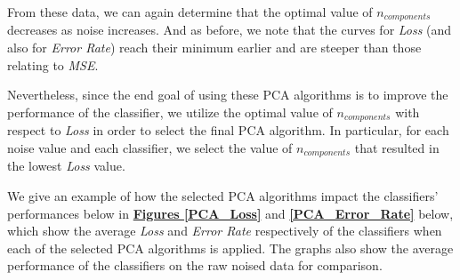 \documentclass[12pt]{article}
\begin{document}
From these data, we can again determine that the optimal value of $n_{components}$ decreases as noise increases. And as before, we note that the curves for \textit{Loss} (and also for \textit{Error Rate}) reach their minimum earlier and are steeper than those relating to \textit{MSE}.

Nevertheless, since the end goal of using these PCA algorithms is to improve the performance of the classifier, we utilize the optimal value of $n_{components}$ with respect to \textit{Loss} in order to select the final PCA algorithm. In particular, for each noise value and each classifier, we select the value of $n_{components}$ that resulted in the lowest \textit{Loss} value. 

We give an example of how the selected PCA algorithms impact the classifiers' performances below in \textbf{\hyperref[PCA_Loss]{Figures \ref*{PCA_Loss}}} and \textbf{\hyperref[PCA_Error_Rate]{\ref*{PCA_Error_Rate}}} below, which show the average \textit{Loss} and \textit{Error Rate} respectively of the classifiers when each of the selected PCA algorithms is applied. The graphs also show the average performance of the classifiers on the raw noised data for comparison.
\end{document}
